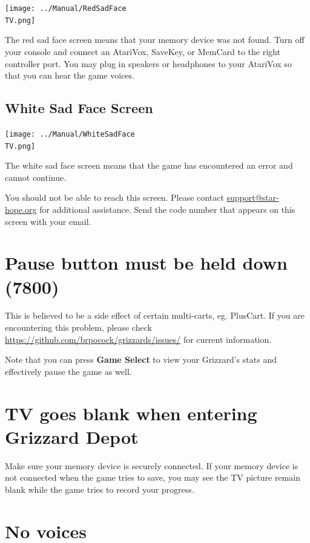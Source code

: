 \documentclass[10pt,twocolumn,openany,article]{memoir}
\newcommand\TV{NTSC}
\newcommand\TV{PAL}
\newcommand\TV{SECAM}
\begin{document}
\begin{description}
\texttt{[image: ../Manual/RedSadFace\\TV.png]}

The red  sad face screen  means that your  memory device was  not found.
Turn off  your console and connect  an AtariVox, SaveKey, or  MemCard to
the right  controller port. You  may plug  in speakers or  headphones to
your AtariVox so that you can hear the game voices.

\fi

\subsection{White Sad Face Screen}

\texttt{[image: ../Manual/WhiteSadFace\\TV.png]}

The white sad  face screen means that the game  has encountered an error
and cannot continue. 

You  should   not  be  able   to  reach  this  screen.   Please  contact
\href{mailto:support@star-hope.org}{support@star-hope.org}           for
additional assistance. Send the code  number that appears on this screen
with your email.

\section{Pause button must be held down (7800)}

This  is believed  to  be  a side  effect  of  certain multi-carts,  eg.
PlusCart.   If  you   are  encountering   this  problem,   please  check
\href{https://github.com/brpocock/grizzards/issues/182}{https://\-github.com/\-brpocock/\-grizzards/\-issues/}
for current information.

Note that  you can  press \textbf{Game Select}  to view  your Grizzard's
stats and effectively pause the game as well.

\ifdefined\NOSAVE\else

\section{TV goes blank when entering Grizzard Depot}

Make  sure your  memory device  is  securely connected.  If your  memory
device is not connected when the game  tries to save, you may see the TV
picture remain blank while the game tries to record your progress.

\section{No voices}


\end{description}
\end{document}
